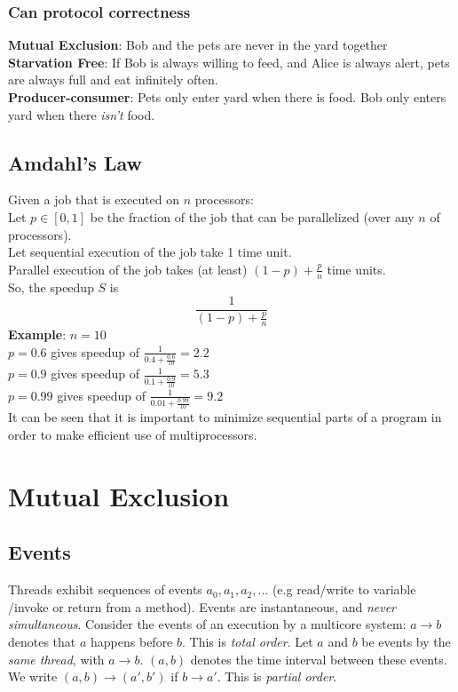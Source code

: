 \documentclass{article}
\begin{document}
\subsubsection{Can protocol correctness}
\textbf{Mutual Exclusion}: Bob and the pets are never in the yard together
\\\textbf{Starvation Free}: If Bob is always willing to feed, and Alice is always alert, pets are always full and eat infinitely often.
\\\textbf{Producer-consumer}: Pets only enter yard when there is food. Bob only enters yard when there \textit{isn't} food.

\subsection{Amdahl's Law}
Given a job that is executed on $n$ processors:
\\Let $p \in [0,1]$ be the fraction of the job that can be parallelized (over any $n$ of processors).
\\Let sequential execution of the job take 1 time unit.
\\Parallel execution of the job takes (at least) $(1-p)+\frac{p}{n}$ time units.
\\So, the speedup $S$ is 
$$\frac{1}{(1-p)+\frac{p}{n}}$$
\textbf{Example}:
$n=10$
\\$p=0.6$ gives speedup of $\frac{1}{0.4 + \frac{0.6}{10}}=2.2$
\\$p=0.9$ gives speedup of $\frac{1}{0.1 + \frac{0.9}{10}}=5.3$
\\$p=0.99$ gives speedup of $\frac{1}{0.01 + \frac{0.99}{10}}=9.2$
\\It can be seen that it is important to minimize sequential parts of a program in order to make efficient use of multiprocessors.






%
%
\section{Mutual Exclusion}
\subsection{Events}
Threads exhibit sequences of events $a_0, a_1, a_2,...$ (e.g read/write to variable /invoke or return from a method).
\bigbreak Events are instantaneous, and \textit{never simultaneous}.
\bigbreak Consider the events of an execution by a multicore system:
$a\rightarrow b$ denotes that $a$ happens before $b$. This is \textit{total order}.
\bigbreak Let $a$ and $b$ be events by the \textit{same thread}, with $a \rightarrow b$.
\bigbreak$(a,b)$ denotes the time interval between these events.
\\We write $(a,b) \rightarrow (a',b')$ if $b \rightarrow a'$. This is \textit{partial order}.
\end{document}
